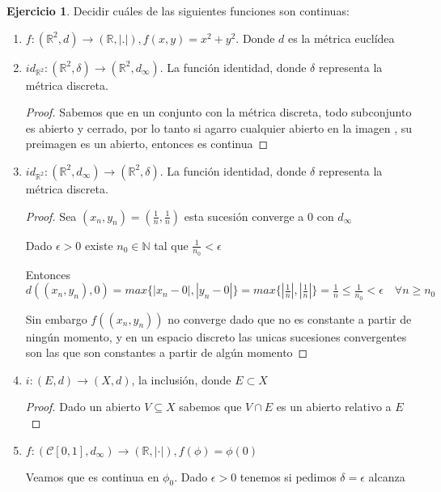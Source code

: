 \documentclass[11pt]{report}
\newcommand{\R}{\mathbb{R}}
\newcommand{\N}{\mathbb{N}}
\newcommand{\ra}{\rightarrow}
\theoremstyle{definition}
\newtheorem{ej}{Ejercicio}
\begin{document}
	\begin{ej}
		Decidir cuáles de las siguientes funciones son continuas:
			\begin{enumerate}
				\item $f: (\R^2, d) \ra (\R, |.|), f(x,y) = x^2 + y^2$. Donde $d$ es la métrica euclídea

				\item $id_{\R^2}: (\R^2,\delta) \ra (\R^2,d_{\infty})$. La función identidad, donde $\delta$ representa la métrica discreta.
					\begin{proof}
						Sabemos que en un conjunto con la métrica discreta, todo subconjunto es abierto y cerrado, por lo tanto si agarro cualquier abierto en la imagen , su preimagen es un abierto, entonces es continua
					\end{proof}
				 		
				\item $id_{\R^2}: (\R^2,d_{\infty}) \ra (\R^2,\delta)$. La función identidad, donde $\delta$ representa la métrica discreta.

					\begin{proof}
						Sea $(x_n,y_n) = (\frac{1}{n},\frac{1}{n})$ esta sucesión converge a 0 con $d_{\infty}$

						Dado $\epsilon >0$ existe $n_0 \in \N$ tal que $\frac{1}{n_0} < \epsilon$

						Entonces $d((x_n,y_n),0) = max\{|x_n - 0 |,|y_n - 0|\} = max\{|\frac{1}{n}|,|\frac{1}{n}|\} = \frac{1}{n} \leq \frac{1}{n_0} < \epsilon \quad \forall n\geq n_0$

						Sin embargo $f((x_n,y_n))$ no converge dado que no es constante a partir de ningún momento, y en un espacio discreto las unicas sucesiones convergentes son las que son constantes a partir de algún momento
					\end{proof}

				\item $i:(E,d) \ra (X,d)$, la inclusión, donde $E \subset X$

					\begin{proof}
						Dado un abierto  $V \subseteq X$ sabemos que $V \cap E$ es un abierto relativo a $E$
					\end{proof}
					
				\item $f:(\mathcal{C}[0,1],d_{\infty}) \ra (\R,|\cdot|), f(\phi) = \phi (0)$

					Veamos que es continua en $\phi_0$. Dado $\epsilon >0$ tenemos si pedimos $\delta = \epsilon$ alcanza


\end{enumerate}
\end{ej}
\end{document}
